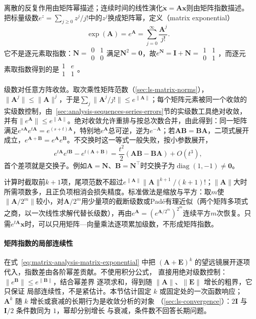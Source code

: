 离散的反复作用由矩阵幂描述；连续时间的线性演化$\dot{\bm x}=\bm A\bm x$则由矩阵指数描述。把标量级数$e^z=\sum_{j\geq0}z^j/j!$中的$z^j$换成矩阵幂，定义（matrix exponential）
\begin{equation}
 \exp(\bm A)=e^{\bm A}=\sum_{j=0}^{\infty}\frac{\bm A^j}{j!}.
 \label{eq:matrix-analysis-matrix-exponential}
\end{equation}
它不是逐元素取指数：$\bm N=\begin{smallmatrix}0&1\\0&0\end{smallmatrix}$满足$\bm N^2=\bm0$，故$e^{\bm N}=\bm I+\bm N=\begin{smallmatrix}1&1\\0&1\end{smallmatrix}$，而逐元素取指数得到的是$\begin{smallmatrix}1&e\\1&1\end{smallmatrix}$。

级数对任意方阵收敛。取次乘性矩阵范数（\ref{sec:ls-matrix-norms}），$\lVert\bm A^j\rVert\leq\lVert\bm A\rVert^j$，于是$\sum_j\lVert\bm A^j/j!\rVert\leq e^{\lVert\bm A\rVert}$；每个矩阵元素被同一个收敛的实级数控制，由~\ref{sec:analysis-sequences-series-errors}节的实级数工具绝对收敛，并有$\lVert e^{\bm A}\rVert\leq e^{\lVert\bm A\rVert}$。绝对收敛允许重排与按总次数合并，由此得到：同一矩阵满足$e^{s\bm A}e^{t\bm A}=e^{(s+t)\bm A}$，特别地$e^{\bm A}$总可逆，逆为$e^{-\bm A}$；若$\bm A\bm B=\bm B\bm A$，二项式展开成立，$e^{\bm A+\bm B}=e^{\bm A}e^{\bm B}$。不交换时这一等式一般失败，按小参数展开，
\[
 e^{t\bm A}e^{t\bm B}-e^{t(\bm A+\bm B)}
 =\frac{t^2}{2}(\bm A\bm B-\bm B\bm A)+O(t^3),
\]
首个差项就是交换子。例如$\bm A=\bm N$、$\bm B=\bm N^\top$时交换子为$\operatorname{diag}(1,-1)\neq\bm0$。

计算时截取前$k+1$项，尾项范数不超过$e^{\lVert\bm A\rVert}\lVert\bm A\rVert^{k+1}/(k+1)!$；$\lVert\bm A\rVert$大时所需项数多，且正负项相消会损失精度。标准做法是缩放与平方：取$m$使$\lVert\bm A/2^m\rVert$较小，对$\bm A/2^m$用少量项的截断级数或Padé有理近似（两个矩阵多项式之商，以一次线性求解代替长级数），再由$e^{\bm A}=(e^{\bm A/2^m})^{2^m}$连续平方$m$次恢复。只需$e^{t\bm A}\bm x$时，可以只用矩阵—向量乘法逐项累加级数，不形成矩阵指数。

\paragraph{矩阵指数的局部连续性}

在式~\eqref{eq:matrix-analysis-matrix-exponential} 中把
$(\bm A+\bm E)^k$ 的望远镜展开逐项代入，指数差由各阶幂差贡献。不使用积分公式，
直接用绝对级数控制：$\lVert e^{\bm B}\rVert\leq e^{\lVert\bm B\rVert}$，结合幂差界
逐项求和，得到随 $\lVert\bm A\rVert$、$\lVert\bm E\rVert$ 增长的粗界，它只保证
局部连续性，不是紧估计。本节估计固定 $k$ 或固定处的一次函数响应；
$\bm A^k$ 随 $k$ 增长或衰减的长期行为是收敛分析的对象
（\ref{sec:ls-convergence}）：$2\bm I$ 与 $\bm I/2$ 条件数同为 $1$，幂却分别增长
与衰减，条件数不回答长期问题。


